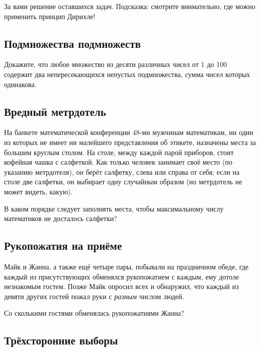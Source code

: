 \bigskip

За вами решение оставшихся задач.
Подсказка: смотрите внимательно, где можно применить принцип Дирихле!

\subsection*{Подмножества подмножеств}%

Докажите, что любое множество из десяти различных чисел от 1 до 100 содержит два непересекающихся непустых подмножества, сумма чисел которых одинакова.

\subsection*{Вредный метрдотель}%

На банкете математической конференции 48-ми мужчинам математикам, ни один из которых не имеет ни малейшего представления об этикете, назначены места за большим круглым столом.
На столе, между каждой парой приборов, стоит кофейная чашка с салфеткой.
Как только человек занимает своё место (по указанию метрдотеля), он берёт салфетку, слева или справа от себя; если на столе две салфетки, он выбирает одну случайным образом (но метрдотель не может видеть, какую).

В каком порядке следует заполнять места, чтобы максимальному числу математиков не досталось салфетки?

\subsection*{Рукопожатия на приёме}%

Майк и Жанна, а также ещё четыре пары, побывали на праздничном обеде, где каждый из присутствующих обменялся рукопожатием с каждым, ему дотоле незнакомым гостем.
Позже Майк опросил всех и обнаружил, что каждый из девяти других гостей пожал руки с \emph{разным} числом людей.

Со сколькими гостями обменялась рукопожатиями Жанна?

\subsection*{Трёхсторонние выборы}%

